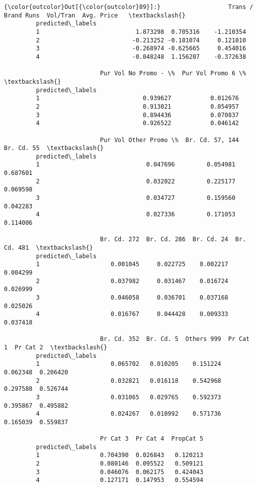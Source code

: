\documentclass[11pt]{article}
\begin{document}
\begin{Verbatim}[commandchars=\\\{\}]
{\color{outcolor}Out[{\color{outcolor}89}]:}                   Trans / Brand Runs  Vol/Tran  Avg. Price   \textbackslash{}
         predicted\_labels                                              
         1                           1.873298  0.705316    -1.210354   
         2                          -0.213252 -0.181074     0.121810   
         3                          -0.268974 -0.625665     0.454016   
         4                          -0.048248  1.156207    -0.372638   
         
                           Pur Vol No Promo - \%  Pur Vol Promo 6 \%  \textbackslash{}
         predicted\_labels                                            
         1                             0.939627           0.012676   
         2                             0.913021           0.054957   
         3                             0.894436           0.070837   
         4                             0.926522           0.046142   
         
                           Pur Vol Other Promo \%  Br. Cd. 57, 144  Br. Cd. 55  \textbackslash{}
         predicted\_labels                                                       
         1                              0.047696         0.054981    0.687601   
         2                              0.032022         0.225177    0.069598   
         3                              0.034727         0.159560    0.042283   
         4                              0.027336         0.171053    0.114006   
         
                           Br. Cd. 272  Br. Cd. 286  Br. Cd. 24  Br. Cd. 481  \textbackslash{}
         predicted\_labels                                                      
         1                    0.001045     0.022725    0.002217     0.004299   
         2                    0.037982     0.031467    0.016724     0.026999   
         3                    0.046058     0.036701    0.037168     0.025026   
         4                    0.016767     0.044428    0.009333     0.037418   
         
                           Br. Cd. 352  Br. Cd. 5  Others 999  Pr Cat 1  Pr Cat 2  \textbackslash{}
         predicted\_labels                                                           
         1                    0.065702   0.010205    0.151224  0.062348  0.206420   
         2                    0.032821   0.016118    0.542968  0.297588  0.526744   
         3                    0.031065   0.029765    0.592373  0.395867  0.495882   
         4                    0.024267   0.010992    0.571736  0.165039  0.559837   
         
                           Pr Cat 3  Pr Cat 4  PropCat 5  
         predicted\_labels                                 
         1                 0.704390  0.026843   0.120213  
         2                 0.080146  0.095522   0.509121  
         3                 0.046076  0.062175   0.424043  
         4                 0.127171  0.147953   0.554594  
\end{Verbatim}
            
\end{document}

